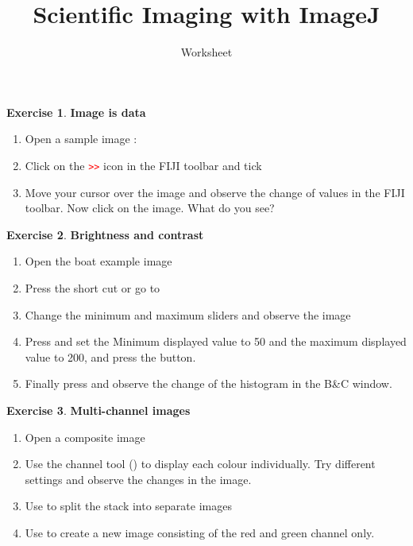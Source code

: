 \documentclass[xcolor=table,DIV=19,twocolumn]{scrartcl}
\title{Scientific Imaging with ImageJ}
\subtitle{Worksheet}
\theoremstyle{definition}
\newtheorem{exercice}{Exercise}
\begin{document}
\maketitle

\begin{exercice} \textbf{Image is data}
  \begin{enumerate}
  \item Open a sample image : 
  \item Click on the \textcolor{red}{\texttt{>>}} icon in the FIJI toolbar and tick
  \item Move your cursor over the image and observe the change of values in the FIJI toolbar. Now click on the image. What do you see?
  \end{enumerate}
\end{exercice}

\begin{exercice} \textbf{Brightness and contrast}
  \begin{enumerate}
  \item Open the boat example image 
  \item Press the short cut  or go to 
  \item Change the minimum and maximum sliders and observe the image
  \item Press  and set the Minimum displayed value to 50
    and the maximum displayed value to 200, and press the  button.
  \item Finally press  and observe the change of the
    histogram in the B\&C window.
  \end{enumerate}
\end{exercice}

\begin{exercice} \textbf{Multi-channel images}
  \begin{enumerate}
  \item Open a composite image 
  \item Use the channel tool () to display each colour individually. Try different settings and observe the changes in the image. 
  \item Use  to split the stack into separate images
  \item Use  to create a new image consisting of the red and green channel only.
  \end{enumerate}
\end{exercice}
\end{document}
